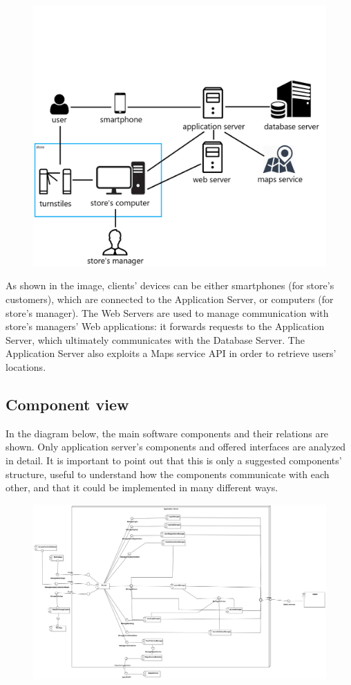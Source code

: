 \documentclass{article}
\begin{document}
\begin{figure}[H]
  \includegraphics[width=\linewidth]{highArchitecture.png}
  
\end{figure}
As shown in the image, clients’ devices can be either smartphones (for store’s customers), which are connected to the Application Server, or computers (for store’s manager). The Web Servers are used to manage communication with store’s managers’ Web applications: it forwards requests to the Application Server, which ultimately communicates with the Database Server. The Application Server also exploits a Maps service API in order to retrieve users’ locations.
\subsection{Component view}
In the diagram below, the main software components and their relations are shown. Only application server's
components and offered interfaces are analyzed in detail. It is important to point out that this is only a
suggested components' structure, useful to understand how the components communicate with each other,
and that it could be implemented in many different ways.
\begin{figure}[H]
  \includegraphics[width=\linewidth]{ComponentDiagram.png}
  
\end{figure}
\end{document}
